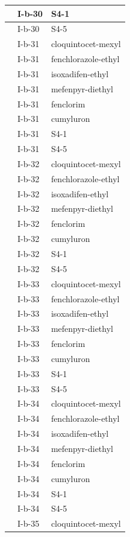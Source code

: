 \documentclass[11pt,a4paper]{article}
\begin{document}
\begin{table}[h]
\begin{tabular}{|l|l|l|}
 & I-b-30 & S4-1 \\ \hline
 & I-b-30 & S4-5 \\ \hline
 & I-b-31 & cloquintocet-mexyl \\ \hline
 & I-b-31 & fenchlorazole-ethyl \\ \hline
 & I-b-31 & isoxadifen-ethyl \\ \hline
 & I-b-31 & mefenpyr-diethyl \\ \hline
 & I-b-31 & fenclorim \\ \hline
 & I-b-31 & cumyluron \\ \hline
 & I-b-31 & S4-1 \\ \hline
 & I-b-31 & S4-5 \\ \hline
 & I-b-32 & cloquintocet-mexyl \\ \hline
 & I-b-32 & fenchlorazole-ethyl \\ \hline
 & I-b-32 & isoxadifen-ethyl \\ \hline
 & I-b-32 & mefenpyr-diethyl \\ \hline
 & I-b-32 & fenclorim \\ \hline
 & I-b-32 & cumyluron \\ \hline
 & I-b-32 & S4-1 \\ \hline
 & I-b-32 & S4-5 \\ \hline
 & I-b-33 & cloquintocet-mexyl \\ \hline
 & I-b-33 & fenchlorazole-ethyl \\ \hline
 & I-b-33 & isoxadifen-ethyl \\ \hline
 & I-b-33 & mefenpyr-diethyl \\ \hline
 & I-b-33 & fenclorim \\ \hline
 & I-b-33 & cumyluron \\ \hline
 & I-b-33 & S4-1 \\ \hline
 & I-b-33 & S4-5 \\ \hline
 & I-b-34 & cloquintocet-mexyl \\ \hline
 & I-b-34 & fenchlorazole-ethyl \\ \hline
 & I-b-34 & isoxadifen-ethyl \\ \hline
 & I-b-34 & mefenpyr-diethyl \\ \hline
 & I-b-34 & fenclorim \\ \hline
 & I-b-34 & cumyluron \\ \hline
 & I-b-34 & S4-1 \\ \hline
 & I-b-34 & S4-5 \\ \hline
 & I-b-35 & cloquintocet-mexyl \\ \hline

\end{tabular}
\end{table}
\end{document}

